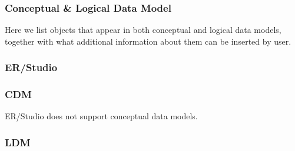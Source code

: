 \subsubsection{Conceptual \& Logical Data Model}

Here we list objects that appear in both conceptual and logical data models, together with what additional information about them can be inserted by user.

\subsubsection{ER/Studio}

\subsubsection{CDM}

ER/Studio does not support conceptual data models.

\subsubsection{LDM}


